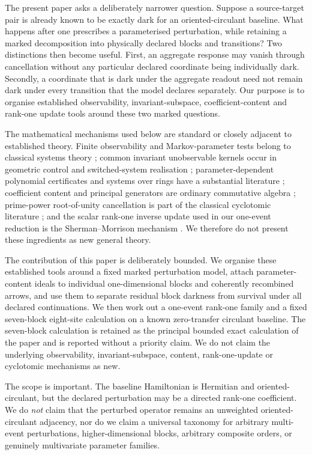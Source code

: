 \documentclass[11pt]{article}
\theoremstyle{definition}
\theoremstyle{remark}
\begin{document}
The present paper asks a deliberately narrower question. Suppose a source-target pair is already known to be exactly dark for an oriented-circulant baseline. What happens after one prescribes a parameterised perturbation, while retaining a marked decomposition into physically declared blocks and transitions? Two distinctions then become useful. First, an aggregate response may vanish through cancellation without any particular declared coordinate being individually dark. Secondly, a coordinate that is dark under the aggregate readout need not remain dark under every transition that the model declares separately. Our purpose is to organise established observability, invariant-subspace, coefficient-content and rank-one update tools around these two marked questions.

The mathematical mechanisms used below are standard or closely adjacent to established theory. Finite observability and Markov-parameter tests belong to classical systems theory \parencite{Kalman1963}; common invariant unobservable kernels occur in geometric control and switched-system realisation \parencite{BasileMarro1969,Petreczky2013}; parameter-dependent polynomial certificates and systems over rings have a substantial literature \parencite{Habets1992,MeniniIFAC2020,MeniniIET2020}; coefficient content and principal generators are ordinary commutative algebra \parencite{StacksContent}; prime-power root-of-unity cancellation is part of the classical cyclotomic literature \parencite{LamLeung2000}; and the scalar rank-one inverse update used in our one-event reduction is the Sherman--Morrison mechanism \parencite{ShermanMorrison1950,Hager1989}. We therefore do not present these ingredients as new general theory.

The contribution of this paper is deliberately bounded. We organise these established tools around a fixed marked perturbation model, attach parameter-content ideals to individual one-dimensional blocks and coherently recombined arrows, and use them to separate residual block darkness from survival under all declared continuations. We then work out a one-event rank-one family and a fixed seven-block eight-site calculation on a known zero-transfer circulant baseline. The seven-block calculation is retained as the principal bounded exact calculation of the paper and is reported without a priority claim. We do not claim the underlying observability, invariant-subspace, content, rank-one-update or cyclotomic mechanisms as new.

The scope is important. The baseline Hamiltonian is Hermitian and oriented-circulant, but the declared perturbation may be a directed rank-one coefficient. We do \emph{not} claim that the perturbed operator remains an unweighted oriented-circulant adjacency, nor do we claim a universal taxonomy for arbitrary multi-event perturbations, higher-dimensional blocks, arbitrary composite orders, or genuinely multivariate parameter families.
\end{document}
